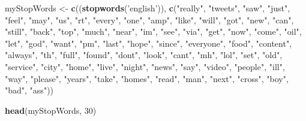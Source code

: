\documentclass[]{article}
\newenvironment{Shaded}{\begin{snugshade}}{\end{snugshade}}
\newcommand{\DecValTok}[1]{\textcolor[rgb]{0.00,0.00,0.81}{#1}}
\newcommand{\KeywordTok}[1]{\textcolor[rgb]{0.13,0.29,0.53}{\textbf{#1}}}
\newcommand{\NormalTok}[1]{#1}
\newcommand{\StringTok}[1]{\textcolor[rgb]{0.31,0.60,0.02}{#1}}
\begin{document}
\begin{Shaded}
\begin{Highlighting}[]
\NormalTok{myStopWords <-}\StringTok{ }\KeywordTok{c}\NormalTok{((}\KeywordTok{stopwords}\NormalTok{(}\StringTok{'english'}\NormalTok{)), }
    \KeywordTok{c}\NormalTok{(}\StringTok{"really"}\NormalTok{, }\StringTok{"tweets"}\NormalTok{, }\StringTok{"saw"}\NormalTok{, }\StringTok{"just"}\NormalTok{, }\StringTok{"feel"}\NormalTok{, }\StringTok{"may"}\NormalTok{, }\StringTok{"us"}\NormalTok{, }\StringTok{"rt"}\NormalTok{, }\StringTok{"every"}\NormalTok{, }\StringTok{"one"}\NormalTok{,}
     \StringTok{"amp"}\NormalTok{, }\StringTok{"like"}\NormalTok{, }\StringTok{"will"}\NormalTok{, }\StringTok{"got"}\NormalTok{, }\StringTok{"new"}\NormalTok{, }\StringTok{"can"}\NormalTok{, }\StringTok{"still"}\NormalTok{, }\StringTok{"back"}\NormalTok{, }\StringTok{"top"}\NormalTok{, }\StringTok{"much"}\NormalTok{,}
     \StringTok{"near"}\NormalTok{, }\StringTok{"im"}\NormalTok{, }\StringTok{"see"}\NormalTok{, }\StringTok{"via"}\NormalTok{, }\StringTok{"get"}\NormalTok{, }\StringTok{"now"}\NormalTok{, }\StringTok{"come"}\NormalTok{, }\StringTok{"oil"}\NormalTok{, }\StringTok{"let"}\NormalTok{, }\StringTok{"god"}\NormalTok{, }\StringTok{"want"}\NormalTok{,}
     \StringTok{"pm"}\NormalTok{, }\StringTok{"last"}\NormalTok{, }\StringTok{"hope"}\NormalTok{, }\StringTok{"since"}\NormalTok{, }\StringTok{"everyone"}\NormalTok{, }\StringTok{"food"}\NormalTok{, }\StringTok{"content"}\NormalTok{, }\StringTok{"always"}\NormalTok{, }\StringTok{"th"}\NormalTok{,}
     \StringTok{"full"}\NormalTok{, }\StringTok{"found"}\NormalTok{, }\StringTok{"dont"}\NormalTok{, }\StringTok{"look"}\NormalTok{, }\StringTok{"cant"}\NormalTok{, }\StringTok{"mh"}\NormalTok{, }\StringTok{"lol"}\NormalTok{, }\StringTok{"set"}\NormalTok{, }\StringTok{"old"}\NormalTok{, }\StringTok{"service"}\NormalTok{,}
     \StringTok{"city"}\NormalTok{, }\StringTok{"home"}\NormalTok{, }\StringTok{"live"}\NormalTok{, }\StringTok{"night"}\NormalTok{, }\StringTok{"news"}\NormalTok{, }\StringTok{"say"}\NormalTok{, }\StringTok{"video"}\NormalTok{, }\StringTok{"people"}\NormalTok{, }\StringTok{"ill"}\NormalTok{, }
     \StringTok{"way"}\NormalTok{,  }\StringTok{"please"}\NormalTok{, }\StringTok{"years"}\NormalTok{, }\StringTok{"take"}\NormalTok{, }\StringTok{"homes"}\NormalTok{, }\StringTok{"read"}\NormalTok{, }\StringTok{"man"}\NormalTok{, }\StringTok{"next"}\NormalTok{, }\StringTok{"cross"}\NormalTok{, }
     \StringTok{"boy"}\NormalTok{, }\StringTok{"bad"}\NormalTok{, }\StringTok{"ass"}\NormalTok{))}

\KeywordTok{head}\NormalTok{(myStopWords, }\DecValTok{30}\NormalTok{)}
\end{Highlighting}
\end{Shaded}
\end{document}
